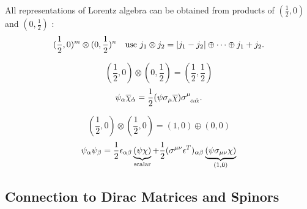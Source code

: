 All representations of Lorentz algebra can be obtained from products of  $(\frac{1}{2}, 0)$  and $(0, \frac{1}{2})$ :
\begin{equation}
  (\frac{1}{2}, 0)^{m} \otimes (0, \frac{1}{2})^{n} \quad \text{use } j_1 \otimes j_2 = \abs{j_1 - j_2} \oplus \dots \oplus j_1 + j_2.
\end{equation}
\begin{example}[]
  \begin{equation}
    (\frac{1}{2}, 0) \otimes (0, \frac{1}{2}) = (\frac{1}{2}, \frac{1}{2})
  \end{equation}
  \begin{equation}
    \psi_{\alpha} \overline{\chi}{}_{\dot\alpha} = \frac{1}{2} (\psi \sigma_{\mu} \overline{\chi}{})\sigma\indices{^{\mu}_{\alpha\dot\alpha}}.
  \end{equation}
\end{example}
\begin{example}[]
  \begin{equation}
    (\frac{1}{2}, 0) \otimes (\frac{1}{2}, 0) = (1, 0) \oplus (0, 0)
  \end{equation}
  \begin{equation}
    \psi_{\alpha} \psi_{\beta} = \frac{1}{2} \epsilon_{\alpha\beta} \underbrace{(\psi \chi)}_{\mathclap{\text{scalar}}} + \frac{1}{2} (\sigma^{\mu\nu} \epsilon^T)_{\alpha\beta} \underbrace{(\psi \sigma_{\mu\nu} \chi)}_{\mathclap{(1, 0)}}
  \end{equation}
\end{example}

\subsection*{Connection to Dirac Matrices and Spinors}%

